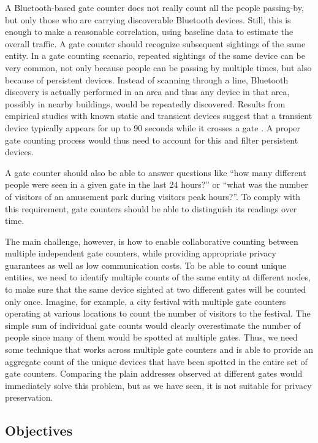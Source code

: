 A Bluetooth-based gate counter does not really count all the people
passing-by, but only those who are carrying discoverable Bluetooth
devices. Still, this is enough to make a reasonable correlation, using
baseline data to estimate the overall traffic. A gate counter should
recognize subsequent sightings of the same entity. In a gate counting
scenario, repeated sightings of the same device can be very common,
not only because people can be passing by multiple times, but also
because of persistent devices. Instead of scanning through a line,
Bluetooth discovery is actually performed in an area and thus any
device in that area, possibly in nearby buildings, would be repeatedly
discovered. Results from empirical studies with known static and
transient devices suggest that a transient device typically appears
for up to 90 seconds while it crosses a gate \cite{Oneill:2006vq}. A
proper gate counting process would thus need to account for this and
filter persistent devices.

A gate counter should also be able to answer questions like ``how many
different people were seen in a given gate in the last 24 hours?'' or
``what was the number of visitors of an amusement park during visitors
peak hours?''. To comply with this requirement, gate counters should
be able to distinguish its readings over time.

The main challenge, however, is how to enable collaborative counting
between multiple independent gate counters, while providing
appropriate privacy guarantees as well as low communication costs. To
be able to count unique entities, we need to identify multiple counts
of the same entity at different nodes, to make sure that the same
device sighted at two different gates will be counted only once.
Imagine, for example, a city festival with multiple gate counters
operating at various locations to count the number of visitors to the
festival. The simple sum of individual gate counts would clearly
overestimate the number of people since many of them would be spotted
at multiple gates. Thus, we need some technique that works across
multiple gate counters and is able to provide an aggregate count of
the unique devices that have been spotted in the entire set
of gate counters. Comparing the plain addresses observed at different
gates would immediately solve this problem, but as we have seen, it is
not suitable for privacy preservation.

\subsection{Objectives}
\label{sec:objectives}

